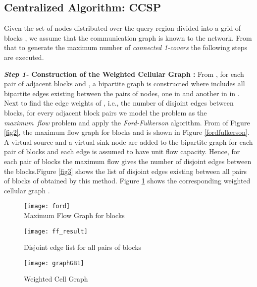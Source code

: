 \documentclass{acm_proc_article-sp}
\begin{document}
  \subsection{\bf Centralized Algorithm: CCSP}
Given the set of nodes  distributed over the query region  divided into a grid of blocks , we assume that the communication graph  is known to the network. From that to generate the maximum number of {\it connected 1-covers} the following steps are executed. 

{\bf {\it Step 1-} Construction of the Weighted Cellular Graph :} From , for each pair of adjacent blocks  and , a bipartite graph  is constructed where  includes all bipartite edges existing between the pairs of nodes, one in  and another in  in . Next to find the edge weights of , i.e., the number of disjoint edges between blocks, for every adjacent block pairs we model the problem as the {\it maximum~flow} problem and apply the {\it Ford-Fulkerson} algorithm. From  of Figure \ref{fig2}, the maximum flow graph for blocks  and  is shown in Figure \ref{fordfulkerson}. A virtual source and a virtual sink node are added to the bipartite graph for each pair of blocks and each edge is assumed to have unit flow capacity. Hence, for each pair of blocks the maximum flow gives the number of disjoint edges between the 
blocks.Figure \ref{fig3} shows the list of disjoint edges existing between all pairs of blocks of  obtained by this method. Figure \ref{fig4} shows the corresponding weighted cellular graph .
		\begin{figure}[ht]
\begin{minipage}[b]{0.26\linewidth}
		 \centering
		   \texttt{[image: ford]}\\
		    \caption{\scriptsize{Maximum Flow Graph for blocks }}
		  \label{fordfulkerson}
		   \end{minipage}
	      \hspace{0.55cm}
	      \begin{minipage}[b]{0.25\linewidth}
		  \centering
		    \texttt{[image: ff\_result]}
		  \caption{\scriptsize{Disjoint edge list for all pairs of blocks}}
		  \label{fig3}
		\end{minipage}
		\hspace{0.6cm}
	      \begin{minipage}[b]{0.21\linewidth}
		  \centering
		     \texttt{[image: graphGB1]}
		  \caption{\scriptsize{Weighted Cell Graph  }}
		  \label{fig4}
		\end{minipage}
		\end{figure}
\end{document}

